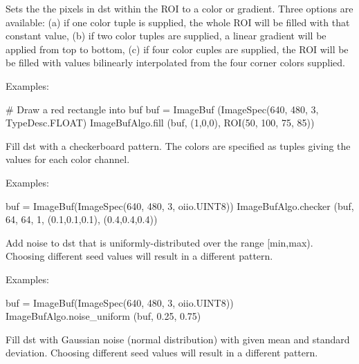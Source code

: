 Sets the the pixels in {\cf dst} within the ROI to a color or gradient.
Three options are available: (a) if one color tuple is supplied, the whole
ROI will be filled with that constant value, (b) if two color tuples are
supplied, a linear gradient will be applied from top to bottom, (c) if
four color cuples are supplied, the ROI will be be filled with values
bilinearly interpolated from the four corner colors supplied.

\smallskip
\noindent Examples:
\begin{code}
    # Draw a red rectangle into buf
    buf = ImageBuf (ImageSpec(640, 480, 3, TypeDesc.FLOAT)
    ImageBufAlgo.fill (buf, (1,0,0), ROI(50, 100, 75, 85))
\end{code}
\apiend


 

Fill {\cf dst} with a checkerboard pattern. The colors are specified as
tuples giving the values for each color channel.

\smallskip
\noindent Examples:
\begin{code}
    buf = ImageBuf(ImageSpec(640, 480, 3, oiio.UINT8))
    ImageBufAlgo.checker (buf, 64, 64, 1, (0.1,0.1,0.1), (0.4,0.4,0.4))
\end{code}
\apiend


 
\NEW %

Add noise to {\cf dst} that is uniformly-distributed over the range
{\cf [min,max)}.  Choosing different seed values will result in a different pattern.

\smallskip
\noindent Examples:
\begin{code}
    buf = ImageBuf(ImageSpec(640, 480, 3, oiio.UINT8))
    ImageBufAlgo.noise_uniform (buf, 0.25, 0.75)
\end{code}
\apiend


 
\NEW %

Fill {\cf dst} with Gaussian noise (normal distribution) with given mean
and standard deviation.
Choosing different seed values will result in a different pattern.

